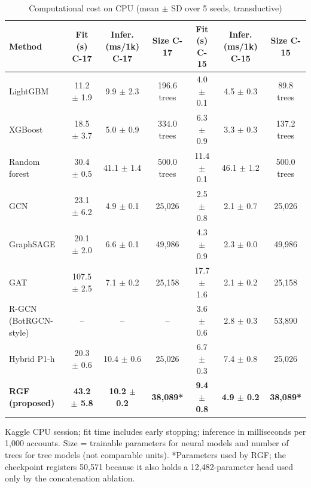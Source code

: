 \begin{table}[!t]
\centering
\caption{Computational cost on CPU (mean $\pm$ SD over 5 seeds, transductive)}
\label{tab:computational_cost}
\scriptsize
\setlength{\tabcolsep}{3pt}
\begin{tabular}{lcccccc}
\hline
\textbf{Method} & \textbf{Fit (s) C-17} & \textbf{Infer. (ms/1k) C-17} & \textbf{Size C-17} & \textbf{Fit (s) C-15} & \textbf{Infer. (ms/1k) C-15} & \textbf{Size C-15} \\
\hline
LightGBM & 11.2 $\pm$ 1.9 & 9.9 $\pm$ 2.3 & 196.6 trees & 4.0 $\pm$ 0.1 & 4.5 $\pm$ 0.3 & 89.8 trees \\
XGBoost & 18.5 $\pm$ 3.7 & 5.0 $\pm$ 0.9 & 334.0 trees & 6.3 $\pm$ 0.9 & 3.3 $\pm$ 0.3 & 137.2 trees \\
Random forest & 30.4 $\pm$ 0.5 & 41.1 $\pm$ 1.4 & 500.0 trees & 11.4 $\pm$ 0.1 & 46.1 $\pm$ 1.2 & 500.0 trees \\
GCN & 23.1 $\pm$ 6.2 & 4.9 $\pm$ 0.1 & 25,026 & 2.5 $\pm$ 0.8 & 2.1 $\pm$ 0.7 & 25,026 \\
GraphSAGE & 20.1 $\pm$ 2.0 & 6.6 $\pm$ 0.1 & 49,986 & 4.3 $\pm$ 0.9 & 2.3 $\pm$ 0.0 & 49,986 \\
GAT & 107.5 $\pm$ 2.5 & 7.1 $\pm$ 0.2 & 25,158 & 17.7 $\pm$ 1.6 & 2.1 $\pm$ 0.2 & 25,158 \\
R-GCN (BotRGCN-style) & -- & -- & -- & 3.6 $\pm$ 0.6 & 2.8 $\pm$ 0.3 & 53,890 \\
Hybrid P1-h & 20.3 $\pm$ 0.6 & 10.4 $\pm$ 0.6 & 25,026 & 6.7 $\pm$ 0.3 & 7.4 $\pm$ 0.8 & 25,026 \\
\textbf{RGF (proposed)} & \textbf{43.2 $\pm$ 5.8} & \textbf{10.2 $\pm$ 0.2} & \textbf{38,089*} & \textbf{9.4 $\pm$ 0.8} & \textbf{4.9 $\pm$ 0.2} & \textbf{38,089*} \\
\hline
\end{tabular}
\par\smallskip\parbox{\linewidth}{\scriptsize Kaggle CPU session; fit time includes early stopping; inference in milliseconds per 1,000 accounts. Size = trainable parameters for neural models and number of trees for tree models (not comparable units). *Parameters used by RGF; the checkpoint registers 50,571 because it also holds a 12,482-parameter head used only by the concatenation ablation.}
\end{table}

